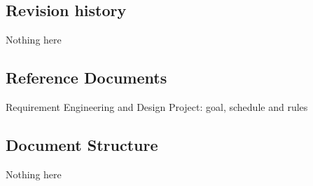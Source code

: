 \subsection{Revision history}
Nothing here

\subsection{Reference Documents}
Requirement Engineering and Design Project: goal, schedule and rules


\subsection{Document Structure}
Nothing here
